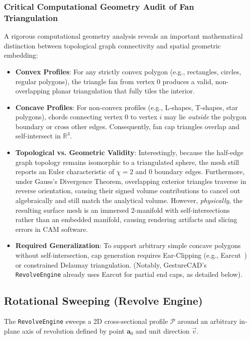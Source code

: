 \subsubsection{Critical Computational Geometry Audit of Fan Triangulation}
A rigorous computational geometry analysis reveals an important mathematical distinction between topological graph connectivity and spatial geometric embedding:
\begin{itemize}
    \item \textbf{Convex Profiles}: For any strictly convex polygon (e.g., rectangles, circles, regular polygons), the triangle fan from vertex 0 produces a valid, non-overlapping planar triangulation that fully tiles the interior.
    \item \textbf{Concave Profiles}: For non-convex profiles (e.g., L-shapes, T-shapes, star polygons), chords connecting vertex 0 to vertex $i$ may lie \textit{outside} the polygon boundary or cross other edges. Consequently, fan cap triangles overlap and self-intersect in $\mathbb{R}^3$.
    \item \textbf{Topological vs. Geometric Validity}: Interestingly, because the half-edge graph topology remains isomorphic to a triangulated sphere, the mesh still reports an Euler characteristic of $\chi = 2$ and 0 boundary edges. Furthermore, under Gauss's Divergence Theorem, overlapping exterior triangles traverse in reverse orientation, causing their signed volume contributions to cancel out algebraically and still match the analytical volume. However, \textit{physically}, the resulting surface mesh is an immersed 2-manifold with self-intersections rather than an embedded manifold, causing rendering artifacts and slicing errors in CAM software.
    \item \textbf{Required Generalization}: To support arbitrary simple concave polygons without self-intersection, cap generation requires Ear-Clipping (e.g., Earcut~\cite{held2001vrp}) or constrained Delaunay triangulation. (Notably, GestureCAD's \texttt{RevolveEngine} already uses Earcut for partial end caps, as detailed below).
\end{itemize}

\subsection{Rotational Sweeping (Revolve Engine)}
The \texttt{RevolveEngine} sweeps a 2D cross-sectional profile $\mathcal{P}$ around an arbitrary in-plane axis of revolution defined by point $\mathbf{a}_0$ and unit direction $\vec{v}$.

